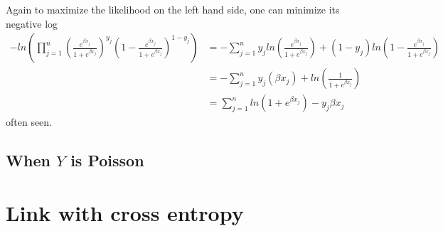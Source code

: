 \documentclass[12pt]{amsart}
\theoremstyle{definition}
\begin{document}
Again to maximize the likelihood on the left hand side, one can minimize its negative log
\begin{align*}
-ln \left( \prod\limits_{j = 1}^n  \left( \frac{e^{\beta x_j}}{1 + e^{\beta x_j}} \right)^{y_j} \left( 1 - \frac{e^{\beta x_j}}{1 + e^{\beta x_j}} \right)^{1 - y_j} \right) & = - \sum\limits_{j = 1}^n y_j ln \left( \frac{e^{\beta x_j}}{1 + e^{\beta x_j}} \right) + (1 - y_j) ln \left( 1 - \frac{e^{\beta x_j}}{1 + e^{\beta x_j}} \right) \\
 & = - \sum\limits_{j = 1}^{n} y_j (\beta x_j) + ln \left( \frac{1}{1 + e^{\beta x_j}} \right) \\
 & = \sum\limits_{j = 1}^n ln(1 + e^{\beta x_j}) - y_j \beta x_j
\end{align*}
often seen.

\subsection{When $Y$ is Poisson}

\section{Link with cross entropy}


\newpage
\begin{bibdiv}
\begin{biblist}
\end{biblist}
\end{bibdiv}
\end{document}
